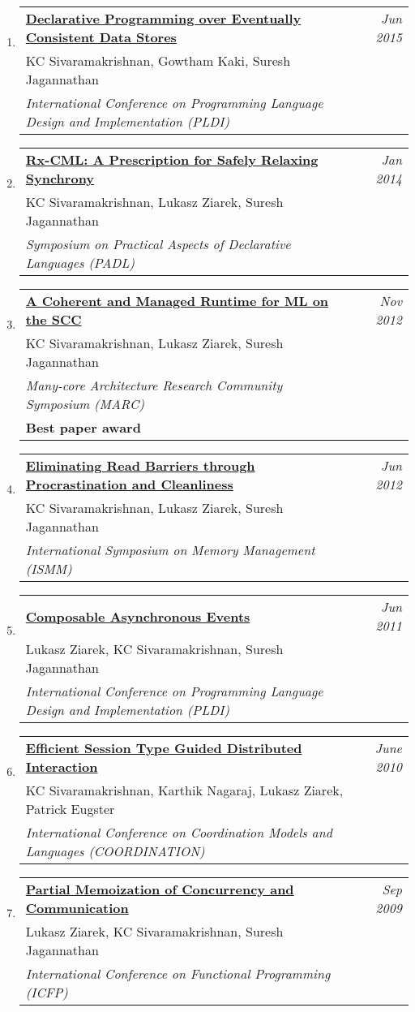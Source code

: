 \documentclass[10pt]{article}
\makeatletter
\newcommand{\lbar}[1]{{\color{#1}\ding{118}}\hspace*{2pt}}
\newenvironment{benumerate}[2]{
    \let\oldItem\item
    \def\item{\addtocounter{enumi}{-2}\oldItem}
    \begin{enumerate}[#2] \itemsep3pt
    \setcounter{enumi}{#1}
    \addtocounter{enumi}{1}}
  {\end{enumerate}}
\newenvironment{publication}[5]
{ \item
  \begin{tabular*}{7.5in}{p{6.3in}@{\extracolsep{\fill}}r}
    \href{#1}{\textbf{#2}} & \textit{#3}\\ #4 &\\ \textit{#5}&\\
  \end{tabular*}
} {}
\newenvironment{publicationNote}[6]
{ \item
  \begin{tabular*}{7.5in}{p{6.3in}@{\extracolsep{\fill}}r}
    \href{#1}{\textbf{#2}} & \textit{#3}\\ #4 &\\ \textit{#5}\\ \textbf{#6} \\
  \end{tabular*}
} {}
\newenvironment{region}[3]{%
  \vspace*{0.5ex}
  {\scalebox{1.4}{\textbf{#1}}}
  \begin{benumerate}{#3}{\color{RoyalBlue}#2}}
  {\end{benumerate}\vspace{0.8ex}}
\makeatother
\begin{document}
\begin{region} {\lbar{purple}Conference Publications}{{C}1}{7}
	\begin{publication} {http://kcsrk.info/papers/quelea_pldi15.pdf}
		{Declarative Programming over Eventually Consistent Data Stores}
		{Jun 2015} {KC Sivaramakrishnan, Gowtham Kaki, Suresh Jagannathan}
		{International Conference on Programming Language Design and Implementation (PLDI)}
	\end{publication}

	\begin{publication}{http://kcsrk.info/papers/rxcml_padl14.pdf}
		{Rx-CML: A Prescription for Safely Relaxing Synchrony}
		{Jan 2014}{KC Sivaramakrishnan, Lukasz Ziarek, Suresh Jagannathan}
		{Symposium on Practical Aspects of Declarative Languages (PADL)}
	\end{publication}

	\begin{publicationNote}{http://kcsrk.info/papers/mmscc_marc12.pdf}
		{A Coherent and Managed Runtime for ML on the SCC}
		{Nov 2012}{KC Sivaramakrishnan, Lukasz Ziarek, Suresh Jagannathan}
		{Many-core Architecture Research Community Symposium (MARC)}
		{Best paper award}
	\end{publicationNote}

	\begin{publication}{http://kcsrk.info/papers/mmgc_ismm12.pdf}
		{Eliminating Read Barriers through Procrastination and Cleanliness}
		{Jun 2012}{KC Sivaramakrishnan, Lukasz Ziarek, Suresh Jagannathan}
		{International Symposium on Memory Management (ISMM)}
	\end{publication}

	\begin{publication}{http://kcsrk.info/papers/acml_pldi11.pdf}
		{Composable Asynchronous Events}
		{Jun 2011}{Lukasz Ziarek, KC Sivaramakrishnan, Suresh Jagannathan}
		{International Conference on Programming Language Design and Implementation (PLDI)}
	\end{publication}

	\begin{publication}{http://kcsrk.info/papers/sting_coordination10.pdf}
		{Efficient Session Type Guided Distributed Interaction}
		{June 2010}{KC Sivaramakrishnan, Karthik Nagaraj, Lukasz Ziarek, Patrick Eugster}
		{International Conference on Coordination Models and Languages (COORDINATION)}
	\end{publication}

	\begin{publication}{http://kcsrk.info/papers/memo_icfp09.pdf}
		{Partial Memoization of Concurrency and Communication}
		{Sep 2009}{Lukasz Ziarek, KC Sivaramakrishnan, Suresh Jagannathan}
		{International Conference on Functional Programming (ICFP)}
	\end{publication}
\end{region}
\end{document}
